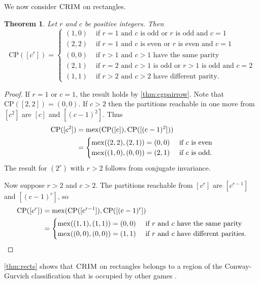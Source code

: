\documentclass[pdflatex,sn-mathphys-num]{sn-jnl}%
\theoremstyle{thmstyleone}%
\newtheorem{theorem}{Theorem}%
\theoremstyle{thmstyletwo}%
\theoremstyle{thmstylethree}%
\newcommand{\mex}{\rm{mex}}
\newcommand{\crim}{\textsc{CRIM} \/}
\newcommand{\cp}{\mathrm{CP}}
\begin{document}
We now consider $\crim$ on rectangles. 

\begin{theorem} \label{thm:cgpairrects}
 Let $r$ and $c$ be positive integers. Then \[\cp([c^r])=\begin{cases}
(1, 0) & \mbox{ if $r = 1$ and $c$ is odd or $r$ is odd and $c=1$} \\
(2, 2) & \mbox{ if $r = 1$ and $c$ is even or $r$ is even and $c = 1$} \\
(0, 0) & \mbox{ if $r > 1$ and $c > 1$ have the same parity} \\
(2, 1) & \mbox{ if $r = 2$ and $c > 1$ is odd or $r > 1$ is odd and $c = 2$} \\ 
(1, 1) & \mbox{ if $r > 2$ and $c > 2$ have different parity}.
\end{cases}\]
\end{theorem}

\begin{proof}
    If $r=1$ or $c=1$, the result holds by \cref{thm:cgpairrow}. Note that $\cp([2,2]) = (0,0)$. If $c > 2$ then the partitions reachable in one move from $[c^2]$ are $[c]$ and $[(c-1)^2]$. Thus \begin{align*}
        \cp([c^2]) &= \mex(\cp([c]), \cp([(c-1)^2])) \\
        &= \begin{cases}
        \mex((2,2), (2,1)) = (0, 0) & \mbox{ if $c$ is even} \\
        \mex((1,0), (0,0)) = (2, 1) & \mbox{ if $c$ is odd.}
    \end{cases} 
    \end{align*}
The result for $(2^r)$ with $r>2$ follows from conjugate invariance. 

    Now suppose $r > 2$ and $c > 2$. The partitions reachable from $[c^r]$ are $[c^{r-1}]$ and $[(c-1)^r]$, so 
    \begin{align*}
        \cp([c^r]) &= \mex(\cp([c^{r-1}]), \cp([(c-1)^r]) \\
        &= \begin{cases}
            \mex((1,1), (1,1)) = (0, 0) & \mbox{ if $r$ and $c$ have the same parity}\\
            \mex((0, 0), (0, 0)) = (1, 1) & \mbox{ if $r$ and $c$ have different parities.} 
        \end{cases}
    \end{align*}
\end{proof}

\cref{thm:rects} shows that $\crim$ on rectangles belongs to a region of the Conway-Gurvich classification that is occupied by other games \cite{gottlieb2025impartialchessintegerpartitions}. 
\end{document}
